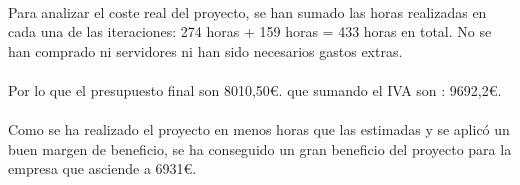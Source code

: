 
\paragraph{} Para analizar el coste real del proyecto, se han sumado las horas realizadas en  cada una de las iteraciones: 274 horas + 159 horas = 433 horas en total. No se han comprado ni servidores ni han sido necesarios gastos extras.  

\paragraph{} Por lo que el presupuesto final son 8010,50\euro. que sumando el IVA son : 9692,2\euro.

\paragraph{} Como se ha realizado el proyecto en menos horas que las estimadas y se aplicó un buen margen de beneficio, se ha conseguido un gran beneficio del proyecto para la empresa que asciende a 6931\euro.